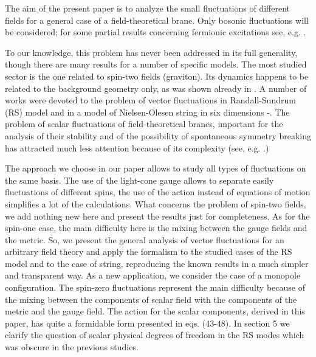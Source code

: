 \documentclass[a4paper,12pt]{article}
\begin{document}
The aim of the present paper is to analyze the small fluctuations of
different fields for a general case of a field-theoretical brane.
Only bosonic fluctuations will be considered; for some partial
results concerning fermionic excitations see, e.g.
\cite{Randjbar-Daemi:2000cr}.

To our  knowledge, this problem has never been addressed in its full
generality, though there are many results for a number of specific
models. The most studied sector is the one related to spin-two fields
(graviton). Its dynamics happens to be related to the background
geometry only, as was shown already in \cite{Randall:1999vf}. A
number of works were devoted to the problem of vector fluctuations in
Randall-Sundrum (RS) model and in a model of Nielsen-Olesen string in
six dimensions \cite{Oda:2000zc}-\cite{Giovannini:2002jf}. The problem of scalar fluctuations of
field-theoretical branes, important for the analysis of their
stability and of the possibility of spontaneous symmetry breaking has
attracted much less attention because of its complexity (see, e.g.
\cite{Giovannini:2001fh}.)

The approach we choose in our paper allows to study all types of
fluctuations on the same basis. The use of the light-cone gauge
allows to separate easily fluctuations of different spins, the use of
the action instead of equations of motion simplifies a lot of the
calculations. What concerns the problem of spin-two fields, we add
nothing new here and present the results just for completeness. As
for the spin-one case, the main difficulty here is the mixing between
the gauge fields and the metric. So, we present the general analysis
of vector fluctuations for an arbitrary field theory  and apply the
formalism to the studied cases of the RS model  and to the case of 
string, reproducing the known results in a much simpler and
transparent way. As a new application, we consider the case of a
monopole configuration.  The spin-zero fluctuations represent the
main difficulty because of the mixing between the components of
scalar field with the components of the metric and the gauge field.
The action for the scalar components, derived in this paper, has
quite a formidable form presented in eqs. (43-48). In section 5 we
clarify the question of scalar physical degrees of freedom in the RS
modes which was obscure in the previous studies.
\end{document}
